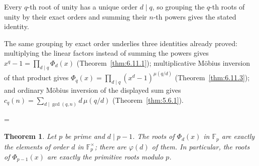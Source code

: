 \documentclass[11pt]{article}
\makeatletter
\theoremstyle{ntstyle}
\newtheorem{theorem}{Theorem}[subsection]
\let\nt@closedisplay\]
\def\nt@guardedclose{\@ifnextchar\par{\nt@closeafterpar}{\@ifnextchar\end{\postdisplaypenalty\@M\nt@closedisplay}{\nt@closedisplay}}}
\def\nt@closeafterpar\par{\@ifnextchar\par{\nt@closeafterpar}{\@ifnextchar\end{\postdisplaypenalty\@M\nt@closedisplay\par}{\nt@closedisplay\par}}}
\renewenvironment{proof}[1][\proofname]{\par
  \pushQED{\qed}\normalfont\topsep\medskipamount\edef\nt@afterproof{\@endparpenalty=\the\@endparpenalty\relax}\@beginparpenalty\@M\@endparpenalty\@M\let\]\nt@guardedclose\trivlist\item[]\textit{#1\@addpunct{.}} \ignorespaces}{\ifvmode\addpenalty\@M\fi\popQED\nt@afterproof\endtrivlist\@endpefalse}
\makeatother
\begin{document}
\begin{proof} Every $q$-th root of unity has a unique order $d\mid q$, so grouping the $q$-th roots of unity by their exact orders and summing their $n$-th powers gives the stated identity.

	The same grouping by exact order underlies three identities already proved:
	multiplying the linear factors instead of summing the powers gives
	$x^{q}-1=\prod_{d\mid q}\Phi_d(x)$ (Theorem~\ref{thm:6.11.1}); multiplicative
	M{\"o}bius inversion of that product gives
	$\Phi_q(x)=\prod_{d\mid q}(x^{d}-1)^{\mu(q/d)}$
	(Theorem~\ref{thm:6.11.3}); and ordinary M{\"o}bius inversion of the displayed
	sum gives $c_q(n)=\sum_{d\mid\gcd(q,n)}d\,\mu(q/d)$
	(Theorem~\ref{thm:5.6.1}).

\end{proof}

\begin{theorem}\label{thm:6.11.6} Let $p$ be prime and $d\mid p-1$. The roots of $\Phi_d(x)$ in $\mathbb{F}_p$ are exactly the elements of order $d$ in $\mathbb{F}_p^{\times}$; there are $\varphi(d)$ of them. In particular, the roots of $\Phi_{p-1}(x)$ are exactly the primitive roots modulo $p$.

\end{theorem}
\end{document}
